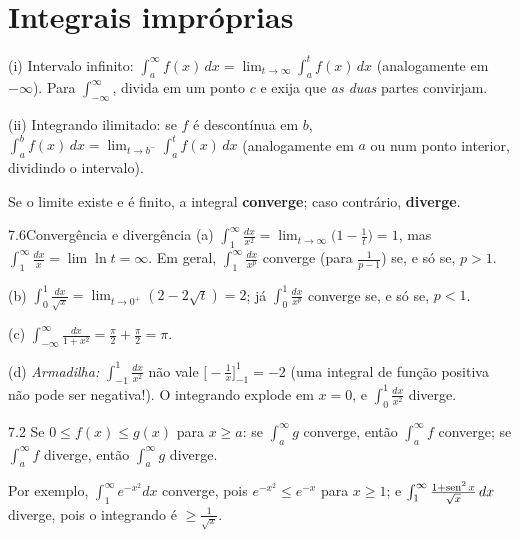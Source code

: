 \section{Integrais impróprias}

\begin{definicao}
(i) Intervalo infinito: $\displaystyle\int_a^\infty f(x)\,dx=\lim_{t\to\infty}\int_a^tf(x)\,dx$
(analogamente em $-\infty$). Para $\int_{-\infty}^\infty$, divida em um ponto $c$ e exija que
\emph{as duas} partes convirjam.

(ii) Integrando ilimitado: se $f$ é descontínua em $b$,
$\displaystyle\int_a^bf(x)\,dx=\lim_{t\to b^-}\int_a^tf(x)\,dx$ (analogamente em $a$ ou num ponto
interior, dividindo o intervalo).

Se o limite existe e é finito, a integral \textbf{converge}; caso contrário, \textbf{diverge}.
\end{definicao}

\begin{exemplo}{7.6}{Convergência e divergência}
(a) $\int_1^\infty\frac{dx}{x^2}=\lim_{t\to\infty}\big(1-\frac1t\big)=1$, mas
$\int_1^\infty\frac{dx}x=\lim\ln t=\infty$. Em geral, $\int_1^\infty\frac{dx}{x^p}$ converge
(para $\frac1{p-1}$) se, e só se, $p>1$.

(b) $\int_0^1\frac{dx}{\sqrt x}=\lim_{t\to0^+}(2-2\sqrt t)=2$; já $\int_0^1\frac{dx}{x^p}$
converge se, e só se, $p<1$.

(c) $\int_{-\infty}^\infty\frac{dx}{1+x^2}=\frac\pi2+\frac\pi2=\pi$.

(d) \emph{Armadilha:} $\int_{-1}^1\frac{dx}{x^2}$ não vale $\big[-\frac1x\big]_{-1}^1=-2$
(uma integral de função positiva não pode ser negativa!). O integrando explode em $x=0$, e
$\int_0^1\frac{dx}{x^2}$ diverge.
\end{exemplo}

\begin{teorema}{7.2}
Se $0\le f(x)\le g(x)$ para $x\ge a$: se $\int_a^\infty g$ converge, então $\int_a^\infty f$
converge; se $\int_a^\infty f$ diverge, então $\int_a^\infty g$ diverge.
\end{teorema}
Por exemplo, $\int_1^\infty e^{-x^2}dx$ converge, pois $e^{-x^2}\le e^{-x}$ para $x\ge1$; e
$\int_1^\infty\frac{1+\operatorname{sen}^2x}{\sqrt x}\,dx$ diverge, pois o integrando é $\ge\frac1{\sqrt x}$.

